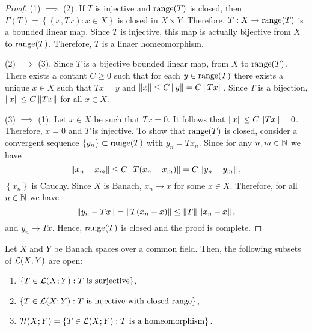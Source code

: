 \documentclass[a4paper]{article}
\begin{document}
\begin{proof}
  (1) $\implies$ (2). If $T$ is injective and $\operatorname{range}(T)$ is closed,
  then $\Gamma(T) = \left\{ (x, Tx) : x \in X \right\}$ is closed in 
  $X \times Y$. Therefore, $T : X \to \operatorname{range} (T)$ is a bounded linear 
  map. Since $T$ is injective, this map is actually bijective from 
  $X$ to $\operatorname{range} (T)$. Therefore, $T$ is a linaer homeomorphism. 

  (2) $\implies$ (3). Since $T$ is a bijective bounded linear map,
  from $X$ to $\operatorname{range}(T)$. There exists a contant $C \geq 0$
  such that for each $y \in \operatorname{range}(T)$ there exists 
  a unique $x \in X$ such that $T x = y$ and $\left\lVert x\right\rVert \leq
  C \left\lVert y\right\rVert = C \left\lVert T x\right\rVert$. Since $T$ is a bijection, 
  $\left\lVert x\right\rVert \leq C \left\lVert T x\right\rVert$ for all $x \in X$. 

  (3) $\implies$ (1). Let $x \in X$ be such that $T x = 0$.
  It follows that $\left\lVert x\right\rVert \leq C \left\lVert T x\right\rVert = 0$. Therefore, 
  $x = 0$ and $T$ is injective. To show that 
  $\operatorname{range}(T)$ is closed, consider a convergent sequence 
  $\left\{ y_n \right\} \subset \operatorname{range}(T)$ with 
  $y_n = T x_n$. Since for any $n, m \in \mathbb{N}$ we have 
  \[
  \left\lVert x_n - x_m\right\rVert \leq C \left\lVert T (x_n - x_m)\right\rVert = C \left\lVert y_n - y_m\right\rVert,
  \]
  $\left\{ x_n \right\}$ is Cauchy. Since $X$ is Banach, 
  $x_n \to x$ for some $x \in X$. Therefore, for 
  all $n \in \mathbb{N}$ we have
  \[
  \left\lVert y_n - T x\right\rVert = \left\lVert T (x_n - x)\right\rVert \leq \left\lVert T\right\rVert \left\lVert x_n - x\right\rVert,
  \]
  and $y_n \to T x$. Hence, $\operatorname{range}(T)$ is closed and the proof is
  complete.

\end{proof}

\begin{thm}
  Let $X$ and $Y$ be Banach spaces over a common field. 
  Then, the following subsets of $\mathcal{L}(X; Y)$ are open:
  \begin{enumerate}
    \item $\left\{ T \in \mathcal{L}(X; Y) : \text{$T$ is surjective} \right\}$,
    \item $\left\{ T \in \mathcal{L}(X; Y) : \text{$T$ is injective with closed range} \right\}$,
    \item $\mathcal{H}(X; Y) = \left\{ T \in \mathcal{L}(X; Y) : \text{$T$ is a homeomorphism} \right\}$.
  \end{enumerate}
\end{thm}
\end{document}

